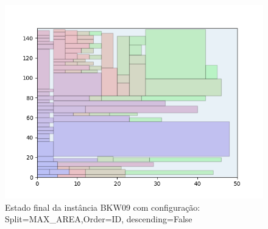 \begin{figure}[H]
    \centering
    \caption[]{Estado final da instância BKW09 com configuração: Split=MAX_AREA,Order=ID, descending=False}
    \label{fig:bkw09-max_area-id-false}
    \includegraphics[scale=0.5]{output/figures/bkw/bkw09/max_area/id/false/000}
\end{figure}